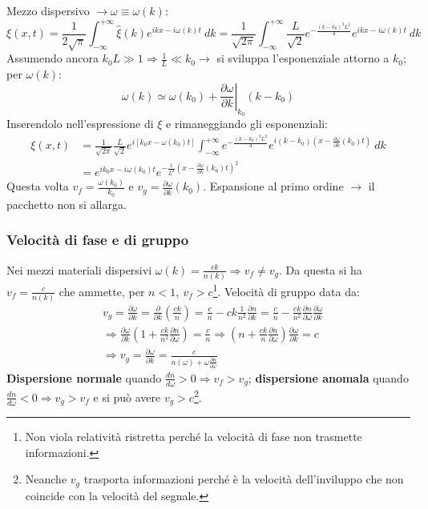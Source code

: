 \documentclass[a4paper]{scrartcl}
\newcommand*\Eval[3]{\left.#1\right\rvert_{#2}^{#3}}
\numberwithin{equation}{subsection}
\theoremstyle{style1}
\begin{document}
Mezzo dispersivo $\to \omega \equiv \omega(k)$:
\[
\xi (x,t) = \frac{1}{2\sqrt{\pi} } \int_{-\infty} ^{+\infty} \hat{\xi }(k) e^{ikx - i\omega(k) t} \ dk=\frac{1}{\sqrt{2\pi} }\int_{-\infty} ^{+\infty} \frac{L}{\sqrt{2} } e^{- \frac{(k-k_0)^2 L^2}{4}} e^{ikx - i\omega(k) t} \ dk
\] 
Assumendo ancora $k_0L\gg 1\Rightarrow \frac{1}{L}\ll k_0\to$ si sviluppa l'esponenziale attorno a $k_0$; per $\omega(k)$:
\[
	\omega(k)\simeq \omega(k_0) + \Eval{\frac{\partial \omega}{\partial k}}{k_0}{}(k-k_0) 
\] 
Inserendolo nell'espressione di $\xi $ e rimaneggiando gli esponenziali:
\begin{equation}
	\begin{split}
		\xi (x,t) &= \frac{1}{\sqrt{2\pi} }\frac{L}{\sqrt{2} } e^{i \left[ k_0x - \omega(k_0) t \right] } \int_{-\infty} ^{+\infty} e^{- \frac{(k-k_0) ^2 L^2}{4}} e^{i(k-k_0) \left(x- \frac{\partial \omega}{\partial k}(k_0)t \right) } \ dk\\
		&=e^{ik_0x - i\omega(k_0) t} e^{-\frac{1}{L^2}\left(x- \frac{\partial \omega}{\partial k}(k_0) t\right) ^2} 
	\end{split}
\end{equation}
Questa volta $v_f = \frac{\omega(k_0)}{k_0}$ e $v_g = \frac{\partial \omega}{\partial k} (k_0)$. Espansione al primo ordine $\to$ il pacchetto non si allarga.
\subsubsection{Velocit\`a di fase e di gruppo}

Nei mezzi materiali dispersivi $\omega(k) = \frac{ck}{n(k)}\Rightarrow v_f \neq v_g$. Da questa si ha $v_f = \frac{c}{n(k)}$ che ammette, per $n<1, \ v_f > c$\footnote{Non viola relativit\`a ristretta perch\'e la velocit\`a di fase non trasmette informazioni.}. Velocit\`a di gruppo data da:
\begin{equation}
	\begin{split}
		&v_g = \frac{\partial \omega}{\partial k} = \frac{\partial }{\partial k} \left(\frac{ck}{n}\right) = \frac{c}{n}- ck \frac{1}{n^2}\frac{\partial n}{\partial k} = \frac{c}{n} - \frac{ck}{n^2} \frac{\partial n}{\partial \omega} \frac{\partial \omega}{\partial k}  \\
		&\Rightarrow \frac{\partial \omega}{\partial k} \left(1+ \frac{ck}{n^2} \frac{\partial n}{\partial \omega} \right) = \frac{c}{n}\Rightarrow \left(n + \frac{ck}{n}\frac{\partial n}{\partial \omega} \right) \frac{\partial \omega}{\partial k}  = c\\
		&\Rightarrow v_g = \frac{\partial \omega}{\partial k} = \frac{c}{n(\omega) + \omega \frac{\partial n}{\partial \omega} }
	\end{split}
\end{equation}
\textbf{Dispersione normale} quando $\frac{d n}{d \omega} >0 \Rightarrow v_f > v_g$; \textbf{dispersione anomala} quando $\frac{d n}{d \omega} <0\Rightarrow v_g > v_f$ e si pu\`o avere $v_g > c$\footnote{Neanche $v_g$ trasporta informazioni perch\'e \`e la velocit\`a dell'inviluppo che non coincide con la velocit\`a del segnale.}.
\end{document}

